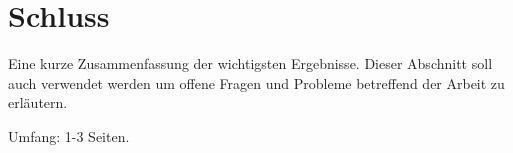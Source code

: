 \chapter{Schluss}
\label{cha:schluss}

Eine kurze Zusammenfassung der wichtigsten Ergebnisse.
Dieser Abschnitt soll auch verwendet werden um offene Fragen und Probleme betreffend der Arbeit zu erl\"autern.

Umfang: 1-3 Seiten.
